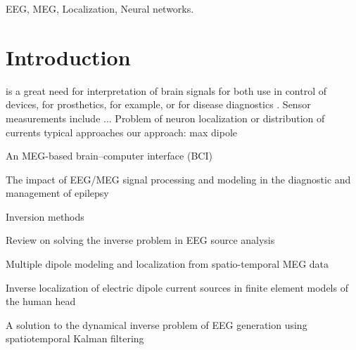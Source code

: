 \documentclass[journal]{IEEEtran}
\begin{document}
\begin{IEEEkeywords}
EEG, MEG, Localization, Neural networks.
\end{IEEEkeywords}






%
\IEEEpeerreviewmaketitle



\section{Introduction}

 is a great need for interpretation of brain signals for both use in control of devices, for prosthetics, for example, or for disease diagnostics . Sensor measurements include ...
Problem of neuron localization or distribution of currents
typical approaches
our approach: max dipole

\cite{mellinger2007meg}

An MEG-based brain--computer interface (BCI)

\cite{da2008impact}

The impact of EEG/MEG signal processing and modeling in the diagnostic and management of epilepsy

Inversion methods

\cite{grech2008review}

Review on solving the inverse problem in EEG source analysis

\cite{mosher1992multiple}

Multiple dipole modeling and localization from spatio-temporal MEG data

\cite{buchner1997inverse}

Inverse localization of electric dipole current sources in finite element models of the human head

\cite{galka2004solution}

A solution to the dynamical inverse problem of EEG generation using spatiotemporal Kalman filtering
\end{document}
